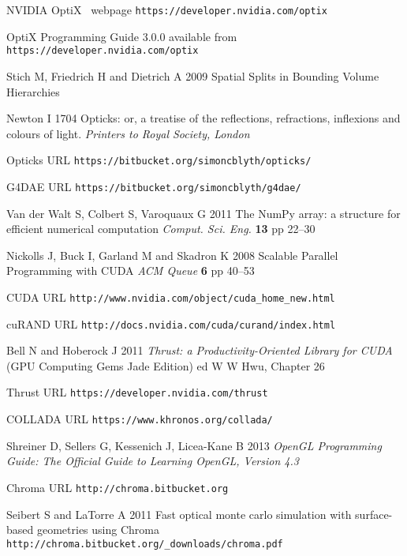\documentclass[a4paper]{jpconf}
\begin{document}
\begin{thebibliography}{9}
NVIDIA{\textregistered} OptiX\texttrademark~ webpage {\tt https://developer.nvidia.com/optix}

OptiX Programming Guide 3.0.0 available from {\tt https://developer.nvidia.com/optix}

Stich M, Friedrich H and Dietrich A 
2009
Spatial Splits in Bounding Volume Hierarchies


Newton I 
1704 
Opticks: or, a treatise of the reflections, refractions, inflexions and colours of light.
{\it Printers to Royal Society, London} 

Opticks URL {\tt https://bitbucket.org/simoncblyth/opticks/}

G4DAE URL {\tt https://bitbucket.org/simoncblyth/g4dae/}

Van der Walt S, Colbert S, Varoquaux G 
2011 
The NumPy array: a structure for efficient numerical computation
{\it Comput. Sci. Eng.} {\bf 13} pp 22--30

Nickolls J, Buck I, Garland M and Skadron K 
2008
Scalable Parallel Programming with CUDA
{\it ACM Queue} {\bf 6} pp 40--53

CUDA URL {\tt http://www.nvidia.com/object/cuda\_home\_new.html}

cuRAND URL {\tt http://docs.nvidia.com/cuda/curand/index.html}


Bell N and Hoberock J 
2011
{\it Thrust: a Productivity-Oriented Library for CUDA}
(GPU Computing Gems Jade Edition) ed W W Hwu, Chapter 26   

Thrust URL {\tt https://developer.nvidia.com/thrust}

COLLADA URL {\tt https://www.khronos.org/collada/}

Shreiner D, Sellers G, Kessenich J, Licea-Kane B 
2013
{\it OpenGL Programming Guide: The Official Guide to Learning OpenGL, Version 4.3}


Chroma URL {\tt http://chroma.bitbucket.org}

Seibert S and LaTorre A 
2011 
Fast optical monte carlo simulation with surface-based geometries using Chroma {\tt http://chroma.bitbucket.org/\_downloads/chroma.pdf}


\end{thebibliography}
\end{document}
